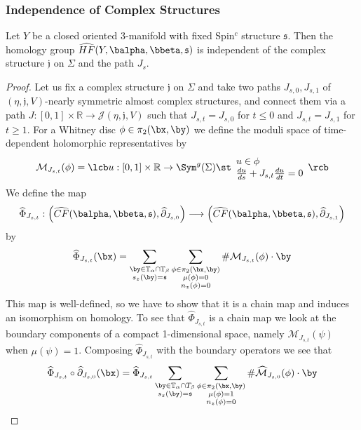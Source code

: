 \subsubsection{Independence of Complex Structures}


\begin{thm}
\label{invariance under change of complex structures}
Let $Y$ be a closed oriented 3-manifold with fixed Spin$^c$ structure $\mathfrak s$. Then the homology group $\widehat{HF}(Y,\balpha,\bbeta,\mathfrak s)$ is independent of the complex structure $\mathfrak j$ on $\Sigma$ and the path $J_s$.
\end{thm}
\begin{proof}
Let us fix a complex structure $\mathfrak j$ on $\Sigma$ and take two paths $J_{s,0},J_{s,1}$ of $(\eta,\mathfrak j,V)$-nearly symmetric almost complex structures, and connect them via a path $J : [0,1] \times \mathbb R \rightarrow \mathcal J(\eta,\mathfrak j,V)$ such that $J_{s,t}=J_{s,0}$ for $t \leq 0$ and $J_{s,t}=J_{s,1}$ for $t \geq 1$. For a Whitney disc $\phi \in \pi_2(\bx,\by)$ we define the moduli space of time-dependent holomorphic representatives by
\[ \mathcal M_{J_{s,t}}(\phi) = \lcb u : \mathbb [0,1] \times \mathbb R \rightarrow \Sym^g(\Sigma) \st \begin{array}{l} u \in \phi \\ \frac{du}{ds} + J_{s,t} \frac{du}{dt} = 0 \end{array} \rcb \]
We define the map
\[ \widehat{\Phi}_{J_{s,t}} : \left( \widehat{CF}(\balpha,\bbeta,\mathfrak s), \widehat{\partial}_{J_{s,0}} \right) \longrightarrow \left( \widehat{CF}(\balpha,\bbeta,\mathfrak s), \widehat{\partial}_{J_{s,1}} \right) \]
by
\[ \widehat{\Phi}_{J_{s,t}}(\bx) = \sum_{\substack{\by \in \mathbb T_\alpha \cap \mathbb T_\beta \\ s_z(\by)=\mathfrak s}} \sum_{\substack{\phi \in \pi_2(\bx,\by) \\ \mu(\phi)=0 \\ n_z(\phi)=0}} \# \mathcal M_{J_{s,t}}(\phi) \cdot \by  \]
This map is well-defined, so we have to show that it is a chain map and induces an isomorphism on homology. To see that $\widehat{\Phi}_{J_{s,t}}$ is a chain map we look at the boundary components of a compact 1-dimensional space, namely $\mathcal M_{J_{s,t}}(\psi)$ when $\mu(\psi)=1$. Composing $\widehat{\Phi}_{J_{s,t}}$ with the boundary operators we see that
\begin{align*}
\widehat{\Phi}_{J_{s,t}} \circ \widehat{\partial}_{J_{s,0}}(\bx) &= \widehat{\Phi}_{J_{s,t}} \sum_{\substack{\by \in \mathbb T_\alpha \cap T_\beta \\ s_z(\by)=\mathfrak s}} \sum_{\substack{\phi \in \pi_2(\bx,\by) \\ \mu(\phi)=1 \\ n_z(\phi)=0}} \# \widehat{\mathcal M}_{J_{s,0}}(\phi) \cdot \by \\

\end{align*}
\end{proof}
